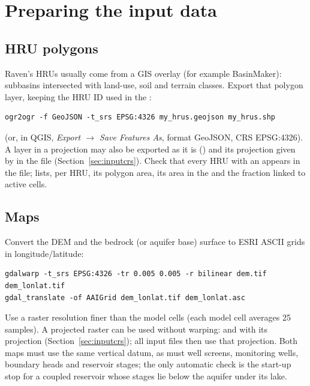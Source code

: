 \section{Preparing the input data}
\subsection{HRU polygons}
Raven's HRUs usually come from a GIS overlay (for example BasinMaker): subbasins intersected with land-use, soil and terrain
classes. Export that polygon layer, keeping the HRU ID used in the :
\par\noindent\begin{minipage}{\linewidth}
\begin{lstlisting}
ogr2ogr -f GeoJSON -t_srs EPSG:4326 my_hrus.geojson my_hrus.shp
\end{lstlisting}
\end{minipage}\par\smallskip
(or, in QGIS, \emph{Export $\rightarrow$ Save Features As}, format GeoJSON, CRS EPSG:4326). A layer in a projection may also be
exported as it is () and its projection given by  in the
 file (Section~\ref{sec:inputcrs}). Check that every HRU with an
 appears in the file;  lists, per HRU, its polygon area, its area in the 
and the fraction linked to active cells.
\subsection{Maps}
Convert the DEM and the bedrock (or aquifer base) surface to ESRI ASCII grids in longitude/latitude:
\par\noindent\begin{minipage}{\linewidth}
\begin{lstlisting}
gdalwarp -t_srs EPSG:4326 -tr 0.005 0.005 -r bilinear dem.tif dem_lonlat.tif
gdal_translate -of AAIGrid dem_lonlat.tif dem_lonlat.asc
\end{lstlisting}
\end{minipage}\par\smallskip
Use a raster resolution finer than the model cells (each model cell averages 25 samples). A projected raster can be used
without warping:  and  with its projection
(Section~\ref{sec:inputcrs}); all input files then use that projection. Both maps must use the same vertical datum, as must
well screens, monitoring wells, boundary heads and reservoir stages; the only automatic check is the start-up stop for a
coupled reservoir whose stages lie below the aquifer under its lake.
